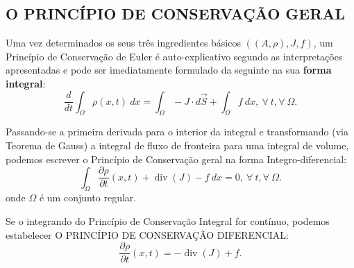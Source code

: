 \subsection{O PRINCÍPIO DE CONSERVAÇÃO GERAL}

Uma vez determinados os seus três ingredientes básicos \(((A,\rho), J, f)\), um Princípio de Conservação de Euler é auto-explicativo segundo as interpretações apresentadas e pode
ser imediatamente formulado da seguinte na sua \textbf{forma integral}:
\[\dfrac{d}{dt} \displaystyle\int_\Omega \rho(x,t)\ dx = \int_\Omega -J \cdot d\vec{S} + \int_\Omega f\ dx,\ \forall\ t, \forall\ \Omega.\]

Passando-se a primeira derivada para o interior da integral e transformando (via Teorema de Gauss) a integral de fluxo de fronteira para uma integral de volume, podemos escrever o Princípio de Conservação geral na forma Integro-diferencial:
\[\displaystyle\int_\Omega \dfrac{\partial \rho}{\partial t} (x,t) + \operatorname{div}(J) - f\ dx = 0,\ \forall\ t, \forall\ \Omega.\]
onde \(\Omega\) é um conjunto regular.


Se o integrando do Princípio de Conservação Integral for contínuo, podemos estabelecer O PRINCÍPIO DE CONSERVAÇÃO DIFERENCIAL:
\[\dfrac{\partial \rho}{\partial t} (x,t) = -\operatorname{div}(J) + f.\]

